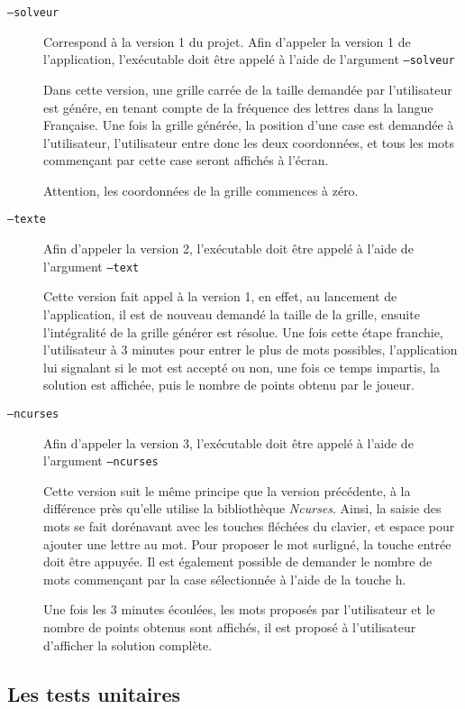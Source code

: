 \documentclass[12pt,a4paper,openany]{book}
\begin{document}
			\begin{description}
				\item[\texttt{--solveur}] Correspond à la version 1 du projet.
Afin d'appeler la version 1 de l'application, l'exécutable doit être appelé à l'aide de
l'argument \texttt{--solveur}

Dans cette version, une grille carrée de la taille demandée par l'utilisateur est génére, en
tenant compte de la fréquence des lettres dans la langue Française. Une fois la grille
générée, la position d'une case est demandée à l'utilisateur, l'utilisateur entre donc les
deux coordonnées, et tous les mots commençant par cette case seront affichés à l'écran.

Attention, les coordonnées de la grille commences à zéro.
				\item[\texttt{--texte}]
					Afin d'appeler la version 2, l'exécutable doit être appelé à l'aide de
					l'argument \texttt{--text}

					Cette version fait appel à la version 1, en effet, au lancement de
					l'application, il est de nouveau demandé la taille de la grille, ensuite
					l'intégralité de la grille générer est résolue. Une fois cette étape
					franchie, l'utilisateur à 3 minutes pour entrer le plus de mots possibles,
					l'application lui signalant si le mot est accepté ou non, une fois ce
					temps impartis, la solution est affichée, puis le nombre de points obtenu
					par le joueur.
				\item[\texttt{--ncurses}]
					Afin d'appeler la version 3, l'exécutable doit être appelé à l'aide de
					l'argument \texttt{--ncurses}

					Cette version suit le même principe que la version précédente, à la
					différence près qu'elle utilise la bibliothèque \textit{Ncurses}. Ainsi, la saisie
					des mots se fait dorénavant avec les touches fléchées du clavier, et
					espace pour ajouter une lettre au mot. Pour proposer le mot surligné, la
					touche entrée doit être appuyée. Il est également possible de demander le
					nombre de mots commençant par la case sélectionnée à l'aide de la touche
					h.

					Une fois les 3 minutes écoulées, les mots proposés par l'utilisateur et le
					nombre de points obtenus sont affichés, il est proposé à l'utilisateur
					d'afficher la solution complète. 
			\end{description}
		\subsection{Les tests unitaires}
\end{document}
